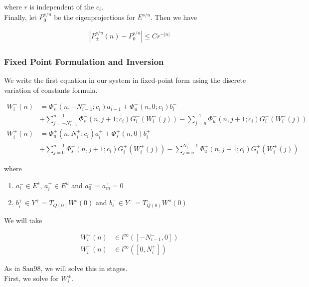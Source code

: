 \documentclass[12pt]{article}
\begin{document}
where $r$ is independent of the $c_i$.\\

Finally, let $P_0^{s/u}$ be the eigenprojections for $E^{s/u}$. Then we have

\begin{align}\label{projbound}
| P_\pm^{s/u}(n) - P_0^{s/u} | \leq C r^{-|n|}
\end{align}

\subsubsection{Fixed Point Formulation and Inversion}

We write the first equation in our system in fixed-point form using the discrete variation of constants formula.

\begin{align*}
W_i^-(n) &= 
\Phi_s^-(n, -N_{i-1}^-; c_i) a_{i-1}^- + \Phi_u^-(n, 0; c_i) b_i^-  \\
&+ \sum_{j = -N_{i-1}^-}^{n-1} \Phi_s^-(n, j+1; c_i) G_i^-(W_i^-(j)) - \sum_{j = n}^{-1} \Phi_u^-(n, j+1; c_i) G_i^-(W_i^-(j)) \\
W_i^+(n) &= \Phi_u^+(n, N_i^+; c_i) a_i^+ + \Phi_s^+(n, 0) b_i^+ \\
&+ \sum_{j = 0}^{n-1} \Phi_s^+(n, j+1; c_i) G_i^+(W_i^+(j)) 
- \sum_{j = n}^{N_i^+-1} \Phi_u^+(n, j+1; c_i) G_i^+(W_i^+(j))
\end{align*}

where 

\begin{enumerate}
\item $a_i^- \in E^s$, $a_i^+ \in E^u$ and $a_0^- = a_m^+ = 0$
\item $b_i^+ \in Y^+ = T_{Q(0)} W^s(0)$ and $b_i^- \in Y^- = T_{Q(0)} W^u(0)$
\end{enumerate}

We will take

\begin{align*}
W_i^-(n) &\in l^\infty([-N_{i-1}^-, 0]) \\
W_i^+(n) &\in l^\infty([0, N_i^+])
\end{align*}

As in San98, we will solve this in stages.\\

First, we solve for $W_i^\pm$.

\end{document}
